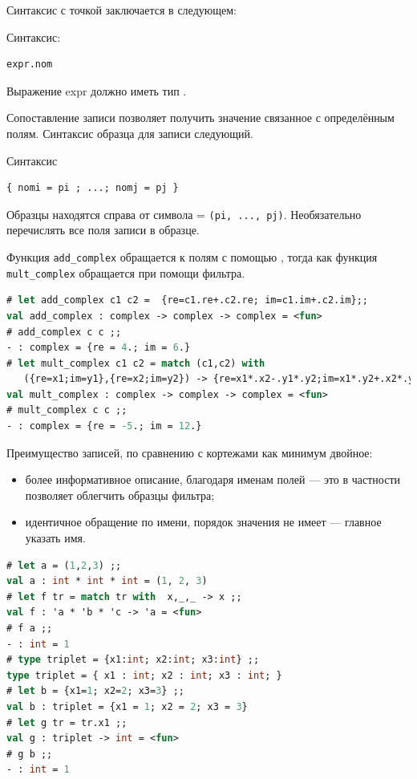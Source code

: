 Синтаксис с точкой заключается в следующем:

Синтаксис:

\begin{lstlisting}[language=OCaml]
expr.nom
\end{lstlisting}

Выражение expr должно иметь тип .

Сопоставление записи позволяет получить значение связанное с определённым полям.
Синтаксис образца для записи следующий.

Синтаксис 

\begin{lstlisting}[language=OCaml]
{ nomi = pi ; ...; nomj = pj }
\end{lstlisting}

Образцы находятся справа от символа = \texttt{(pi, ..., pj)}. Необязательно
перечислять все поля записи в образце.

Функция \texttt{add\_complex} обращается к полям с помощью , тогда
как функция \texttt{mult\_complex} обращается при помощи фильтра.

\begin{lstlisting}[language=OCaml]
# let add_complex c1 c2 =  {re=c1.re+.c2.re; im=c1.im+.c2.im};;
val add_complex : complex -> complex -> complex = <fun>
# add_complex c c ;;
- : complex = {re = 4.; im = 6.}
# let mult_complex c1 c2 = match (c1,c2) with
   ({re=x1;im=y1},{re=x2;im=y2}) -> {re=x1*.x2-.y1*.y2;im=x1*.y2+.x2*.y1} ;;
val mult_complex : complex -> complex -> complex = <fun>
# mult_complex c c ;;
- : complex = {re = -5.; im = 12.}
\end{lstlisting}

Преимущество записей, по сравнению с кортежами как минимум двойное:

\begin{itemize}
	\item более информативное описание, благодаря именам полей --- это в
частности позволяет облегчить образцы фильтра;

	\item идентичное обращение по имени, порядок значения не имеет --- главное
указать имя.
\end{itemize}

\begin{lstlisting}[language=OCaml]
# let a = (1,2,3) ;;
val a : int * int * int = (1, 2, 3)
# let f tr = match tr with  x,_,_ -> x ;;
val f : 'a * 'b * 'c -> 'a = <fun>
# f a ;;
- : int = 1
# type triplet = {x1:int; x2:int; x3:int} ;;
type triplet = { x1 : int; x2 : int; x3 : int; }
# let b = {x1=1; x2=2; x3=3} ;;
val b : triplet = {x1 = 1; x2 = 2; x3 = 3}
# let g tr = tr.x1 ;;
val g : triplet -> int = <fun>
# g b ;;
- : int = 1
\end{lstlisting}

